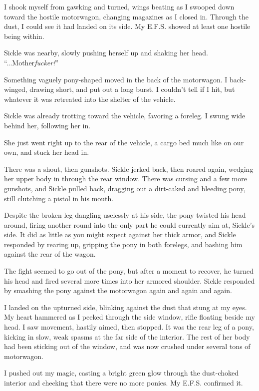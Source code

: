 I shook myself from gawking and turned, wings beating as I swooped down toward the hostile motorwagon, changing magazines as I closed in. Through the dust, I could see it had landed on its side. My E.F.S. showed at least one hostile being within.

Sickle was nearby, slowly pushing herself up and shaking her head. “...Mother\textit{fucker!}”

Something vaguely pony-shaped moved in the back of the motorwagon. I back-winged, drawing short, and put out a long burst. I couldn’t tell if I hit, but whatever it was retreated into the shelter of the vehicle.

Sickle was already trotting toward the vehicle, favoring a foreleg. I swung wide behind her, following her in.

She just went right up to the rear of the vehicle, a cargo bed much like on our own, and stuck her head in.

There was a shout, then gunshots. Sickle jerked back, then roared again, wedging her upper body in through the rear window. There was cursing and a few more gunshots, and Sickle pulled back, dragging out a dirt-caked and bleeding pony, still clutching a pistol in his mouth.

Despite the broken leg dangling uselessly at his side, the pony twisted his head around, firing another round into the only part he could currently aim at, Sickle’s side. It did as little as you might expect against her thick armor, and Sickle responded by rearing up, gripping the pony in both forelegs, and bashing him against the rear of the wagon.

The fight seemed to go out of the pony, but after a moment to recover, he turned his head and fired several more times into her armored shoulder. Sickle responded by smashing the pony against the motorwagon again and again and again.

I landed on the upturned side, blinking against the dust that stung at my eyes. My heart hammered as I peeked through the side window, rifle floating beside my head. I saw movement, hastily aimed, then stopped. It was the rear leg of a pony, kicking in slow, weak spasms at the far side of the interior. The rest of her body had been sticking out of the window, and was now crushed under several tons of motorwagon.

I pushed out my magic, casting a bright green glow through the dust-choked interior and checking that there were no more ponies. My E.F.S. confirmed it.

